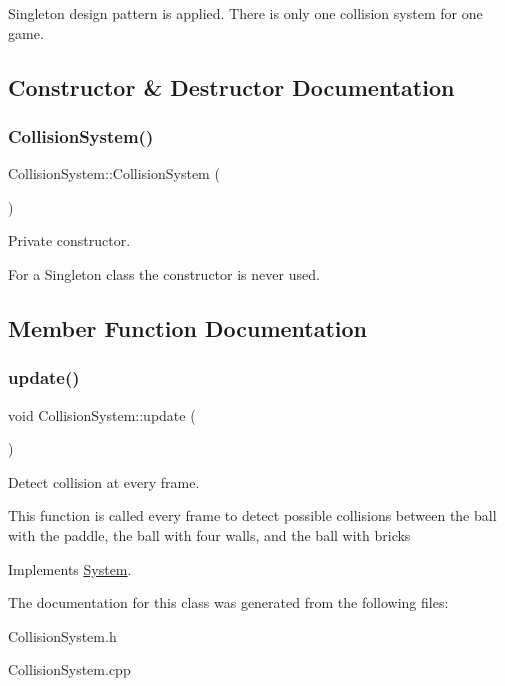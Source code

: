 Singleton design pattern is applied. There is only one collision system for one game. 

\subsection{Constructor \& Destructor Documentation}
\mbox{\label{class_collision_system_ac8b1ff32bb9c9ff3e765c2b334713454}} 
\subsubsection{\texorpdfstring{Collision\+System()}{CollisionSystem()}}
{\footnotesize\ttfamily Collision\+System\+::\+Collision\+System (\begin{DoxyParamCaption}{ }\end{DoxyParamCaption})\hspace{0.3cm}{\ttfamily [private]}}



Private constructor. 

For a Singleton class the constructor is never used. 

\subsection{Member Function Documentation}
\mbox{\label{class_collision_system_ac437e5f41c5e333bf852a5fc34c0c127}} 
\subsubsection{\texorpdfstring{update()}{update()}}
{\footnotesize\ttfamily void Collision\+System\+::update (\begin{DoxyParamCaption}{ }\end{DoxyParamCaption})\hspace{0.3cm}{\ttfamily [virtual]}}



Detect collision at every frame. 

This function is called every frame to detect possible collisions between the ball with the paddle, the ball with four walls, and the ball with bricks 

Implements \mbox{\hyperlink{class_system_aad9113b7c2864e72d96232eadc13bc39}{System}}.



The documentation for this class was generated from the following files\+:\begin{DoxyCompactItemize}
\item 
Collision\+System.\+h\item 
Collision\+System.\+cpp\end{DoxyCompactItemize}
